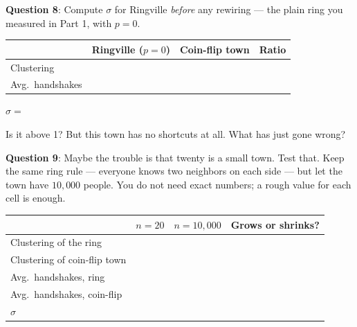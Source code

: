 \documentclass[a4paper, 14pt]{extarticle}
\begin{document}
\begin{minipage}{\textwidth}
{\bf Question 8}:
Compute $\sigma$ for Ringville \emph{before} any rewiring --- the plain ring you
measured in Part 1, with $p = 0$.

\begin{center}
\begin{tabular}{|l|p{2.6cm}|p{2.6cm}|p{2.2cm}|}
\hline
 & Ringville ($p=0$) & Coin-flip town & Ratio \\
\hline
Clustering & & & \\[0.4cm]
\hline
Avg.\ handshakes & & & \\[0.4cm]
\hline
\end{tabular}
\end{center}

\vspace{0.5em}

$\sigma = $ \underline{\hspace{3cm}}

\vspace{0.8em}

Is it above 1? \underline{\hspace{1.5cm}} \quad
But this town has no shortcuts at all. What has just gone wrong?

\underline{\hspace{\textwidth}}
\end{minipage}

\vspace{2em}

\begin{minipage}{\textwidth}
{\bf Question 9}:
Maybe the trouble is that twenty is a small town. Test that. Keep the same ring
rule --- everyone knows two neighbors on each side --- but let the town have
$10{,}000$ people. You do not need exact numbers; a rough value for each cell is
enough.

\begin{center}
\begin{tabular}{|l|p{2.4cm}|p{2.4cm}|p{2.4cm}|}
\hline
 & $n = 20$ & $n = 10{,}000$ & Grows or shrinks? \\
\hline
Clustering of the ring & & & \\[0.4cm]
\hline
Clustering of coin-flip town & & & \\[0.4cm]
\hline
Avg.\ handshakes, ring & & & \\[0.4cm]
\hline
Avg.\ handshakes, coin-flip & & & \\[0.4cm]
\hline
$\sigma$ & & & \\[0.4cm]
\hline
\end{tabular}
\end{center}
\end{minipage}
\end{document}
